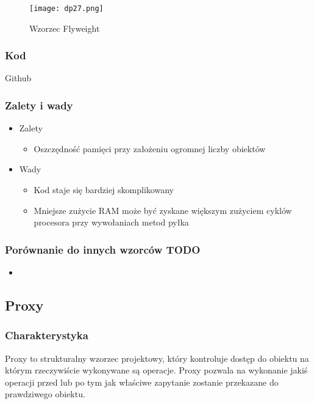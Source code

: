 \documentclass[a4paper,15pt]{article}
\begin{document}
\begin{figure}[H]
\centering
  \texttt{[image: dp27.png]}
  \caption{Wzorzec Flyweight}
\end{figure}

\subsubsection{Kod}
Github

\subsubsection{Zalety i wady}


\begin{itemize}
\item Zalety
\begin{itemize}
\item Oszczędność pamięci przy założeniu ogromnej liczby obiektów
\end{itemize}
\item Wady
\begin{itemize}
\item Kod staje się bardziej skomplikowany
\item Mniejsze zużycie RAM może być zyskane większym zużyciem cyklów procesora przy wywołaniach metod pyłka 
\end{itemize}
\end{itemize}


\subsubsection{Porównanie do innych wzorców TODO}
\begin{itemize}
\item
\end{itemize}

\newpage
\subsection{Proxy}

\subsubsection{Charakterystyka}
Proxy to strukturalny wzorzec projektowy, który kontroluje dostęp do obiektu na którym rzeczywiście wykonywane są operacje. Proxy pozwala na wykonanie jakiś operacji przed lub po tym jak właściwe zapytanie zostanie przekazane do prawdziwego obiektu.
\end{document}
